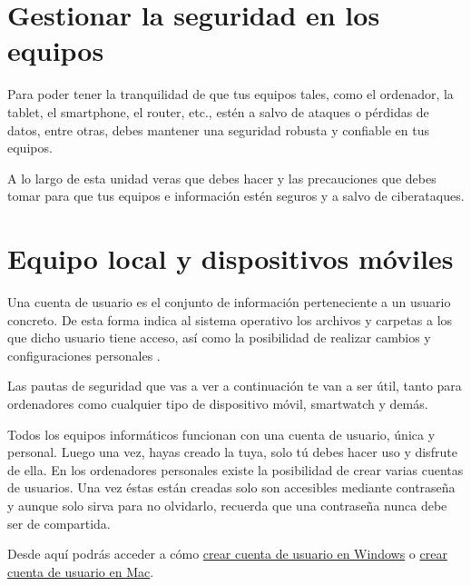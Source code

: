 \documentclass[
  spanish,
  a4paper,
  openany]{book}
\begin{document}
\hypertarget{gestionar-la-seguridad-en-los-equipos}{%
\section{Gestionar la seguridad en los equipos}\label{gestionar-la-seguridad-en-los-equipos}}

Para poder tener la tranquilidad de que tus equipos tales, como el ordenador, la tablet, el smartphone, el router, etc., estén a salvo de ataques o pérdidas de datos, entre otras, debes mantener una seguridad robusta y confiable en tus equipos.

A lo largo de esta unidad veras que debes hacer y las precauciones que debes tomar para que tus equipos e información estén seguros y a salvo de ciberataques.

\hypertarget{equipo-local-y-dispositivos-muxf3viles}{%
\section{Equipo local y dispositivos móviles}\label{equipo-local-y-dispositivos-muxf3viles}}

Una cuenta de usuario es el conjunto de información perteneciente a un usuario concreto. De esta forma indica al sistema operativo los archivos y carpetas a los que dicho usuario tiene acceso, así como la posibilidad de realizar cambios y configuraciones personales \citep{OSI-cuentas}.

Las pautas de seguridad que vas a ver a continuación te van a ser útil, tanto para ordenadores como cualquier tipo de dispositivo móvil, smartwatch y demás.

Todos los equipos informáticos funcionan con una cuenta de usuario, única y personal. Luego una vez, hayas creado la tuya, solo tú debes hacer uso y disfrute de ella. En los ordenadores personales existe la posibilidad de crear varias cuentas de usuarios. Una vez éstas están creadas solo son accesibles mediante contraseña y aunque solo sirva para no olvidarlo, recuerda que una contraseña nunca debe ser de compartida.

Desde aquí podrás acceder a cómo \href{https://support.microsoft.com/es-es/windows/crear-una-cuenta-de-administrador-o-de-usuario-local-en-windows-10-20de74e0-ac7f-3502-a866-32915af2a34d}{crear cuenta de usuario en Windows} o \href{https://support.apple.com/es-es/guide/mac-help/mtusr001/mac\#:~:text=A\%C3\%B1adir\%20un\%20usuario,en\%20\%E2\%80\%9CUsuarios\%20y\%20grupos\%E2\%80\%9D.\&text=Si\%20el\%20candado\%20situado\%20en,bajo\%20la\%20lista\%20de\%20usuarios}{crear cuenta de usuario en Mac}.
\end{document}
